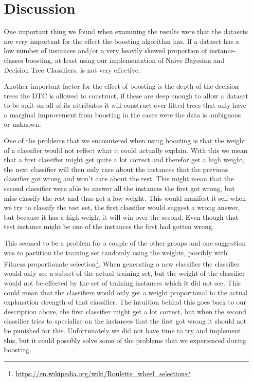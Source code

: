 \section{Discussion}\label{discussion}
One important thing we found when examining the results were that the datasets 
are very important for the effect the boosting algorithm has. If a dataset has 
a low number of instances and/or a very heavily skewed proportion of 
instance-classes boosting, at least using our implementation of Naive Bayesian 
and Decision Tree Classifiers, is not very effective.

Another important factor for the effect of boosting is the depth of the 
decision trees the DTC is allowed to construct, if these are deep enough to 
allow a dataset to be split on all of its attributes it will construct 
over-fitted trees that only have a marginal improvement from boosting in the 
cases were the data is ambiguous or unknown.

One of the problems that we encountered when using boosting is that the weight
of a classifier would not reflect what it could actually explain. With this we
mean that a first classifier might get quite a lot correct and therefor get
a high weight, the next classifier will then only care about the instances that
the previous classifier got wrong and won't care about the rest. This might mean that
the second classifier were able to answer all the instances the first got wrong,
but miss classify the rest and thus get a low weight. This would manifest it self
when we try to classify the test set, the first classifier would suggest a wrong
answer, but because it has a high weight it will win over the second. Even though
that test instance might be one of the instances the first had gotten wrong.

This
seemed to be a problem for a couple of the other groups and one suggestion was to
partition the training set randomly using the weights, possibly with Fitness
proportionate selection\footnote{\url{
https://en.wikipedia.org/wiki/Roulette_wheel_selection}}. When generating a new
classifier the classifier would only see a subset of the actual training set, but
the weight of the classifier would not be effected by the set of training instances
which it did not see. This could mean that the classifiers would only get a weight
proportional to the actual explanation strength of that classifier. The intuition
behind this goes back to our description above, the first classifier might get a
lot correct, but when the second classifier tries to specialize on the instances
that the first got wrong it should not be punished for this. Unfortunately
we did not have time to try and implement this, but it could possibly solve some
of the problems that we experienced during boosting.
